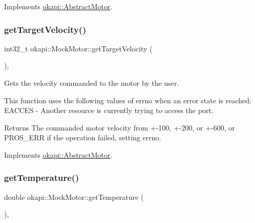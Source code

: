 Implements \mbox{\hyperlink{classokapi_1_1AbstractMotor_a144377e461ec5801289c37bab5132cce}{okapi\+::\+Abstract\+Motor}}.

\mbox{\label{classokapi_1_1MockMotor_ae4b2cda25c0eec17e0ab4f59fae33a0b}} 
\subsubsection{\texorpdfstring{getTargetVelocity()}{getTargetVelocity()}}
{\footnotesize\ttfamily int32\+\_\+t okapi\+::\+Mock\+Motor\+::get\+Target\+Velocity (\begin{DoxyParamCaption}{ }\end{DoxyParamCaption})\hspace{0.3cm}{\ttfamily [override]}, {\ttfamily [virtual]}}



Gets the velocity commanded to the motor by the user. 

This function uses the following values of errno when an error state is reached\+: E\+A\+C\+C\+ES -\/ Another resource is currently trying to access the port.

\begin{DoxyReturn}{Returns}
The commanded motor velocity from +-\/100, +-\/200, or +-\/600, or P\+R\+O\+S\+\_\+\+E\+RR if the operation failed, setting errno. 
\end{DoxyReturn}


Implements \mbox{\hyperlink{classokapi_1_1AbstractMotor_a96b02cca7b51f75c01d2d22aab474fe4}{okapi\+::\+Abstract\+Motor}}.

\mbox{\label{classokapi_1_1MockMotor_a3ce754d9d86a8c4a136c8f11edaf03d4}} 
\subsubsection{\texorpdfstring{getTemperature()}{getTemperature()}}
{\footnotesize\ttfamily double okapi\+::\+Mock\+Motor\+::get\+Temperature (\begin{DoxyParamCaption}{ }\end{DoxyParamCaption})\hspace{0.3cm}{\ttfamily [override]}, {\ttfamily [virtual]}}



